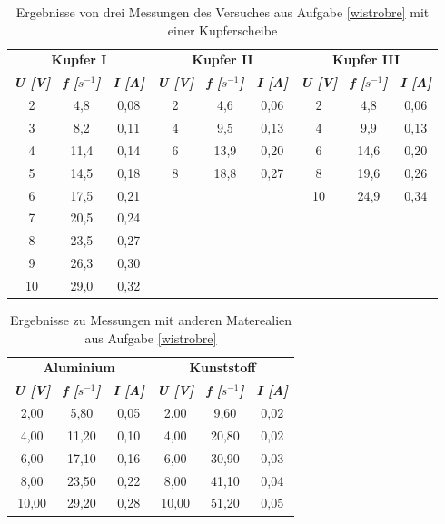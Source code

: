 \begin{table}[h]
\centering
\begin{tabular}{c c c | c c c | c c c}
\multicolumn{3}{c}{\textbf{Kupfer I}} & \multicolumn{3}{c}{\textbf{Kupfer II}} & \multicolumn{3}{c}{\textbf{Kupfer III}} \\
\textbf{\textit{U [V]}}	&	\textbf{\textit{f [\(s^{-1}\)]}}  &	\textbf{\textit{I [A]}} & \textbf{\textit{U [V]}}	&	\textbf{\textit{f [\(s^{-1}\)]}}  &	\textbf{\textit{I [A]}} & \textbf{\textit{U [V]}}	&	\textbf{\textit{f [\(s^{-1}\)]}}  &	\textbf{\textit{I [A]}} \\
\hline
2	&	4,8	&	0,08	&	2	&	4,6	&	0,06	&	2	&	4,8	&	0,06 \\
3	&	8,2	&	0,11	&	4	&	9,5	&	0,13	&	4	&	9,9	&	0,13 \\
4	&	11,4	&	0,14	&	6	&	13,9	&	0,20	&	6	&	14,6	&	0,20 \\
5	&	14,5	&	0,18	&	8	&	18,8	&	0,27	&	8	&	19,6	&	0,26 \\
6	&	17,5	&	0,21	&		&		&		&	10	&	24,9	&	0,34 \\
7	&	20,5	&	0,24	&		&		&		&		&		&	\\
8	&	23,5	&	0,27	&		&		&		&		&		&	\\
9	&	26,3	&	0,30	&		&		&		&		&		&	\\
10	&	29,0	&	0,32	&		&		&		&		&		&	\\
\end{tabular}
\caption{Ergebnisse von drei Messungen des Versuches aus Aufgabe \ref{wistrobre} mit einer Kupferscheibe}
\label{tabkup1}
\end{table}


\begin{table}[h]
\centering
\begin{tabular}{c c c | c c c}
\multicolumn{3}{c}{\textbf{Aluminium}} & \multicolumn{3}{c}{\textbf{Kunststoff}} \\
\textbf{\textit{U [V]}}	&	\textbf{\textit{f [\(s^{-1}\)]}}  &	\textbf{\textit{I [A]}} & \textbf{\textit{U [V]}}	&	\textbf{\textit{f [\(s^{-1}\)]}}  &	\textbf{\textit{I [A]}} \\
\hline
2,00	&	5,80	&	0,05	&	2,00	&	9,60	&	0,02 \\
4,00	&	11,20	&	0,10	&	4,00	&	20,80	&	0,02 \\
6,00	&	17,10	&	0,16	&	6,00	&	30,90	&	0,03 \\
8,00	&	23,50	&	0,22	&	8,00	&	41,10	&	0,04 \\
10,00	&	29,20	&	0,28	&	10,00	&	51,20	&	0,05 \\
\end{tabular}
\caption{Ergebnisse zu Messungen mit anderen Materealien aus Aufgabe \ref{wistrobre}}
\label{tabmat1}
\end{table}




